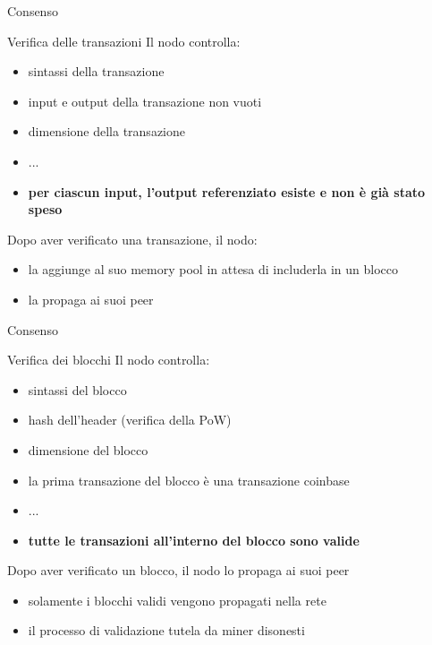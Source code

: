 \documentclass{beamer}
\begin{document}
  
  \begin{frame}{Consenso}
      \begin{block}{Verifica delle transazioni}
      Il nodo controlla: 
        \begin{itemize}
            \item sintassi della transazione
            \item input e output della transazione non vuoti
            \item dimensione della transazione 
            \item ...
            \item \textbf{per ciascun input, l'output referenziato esiste e non è già stato speso}
        \end{itemize}
      \end{block}
      Dopo aver verificato una transazione, il nodo:
      \begin{itemize}
          \item la aggiunge al suo memory pool in attesa di includerla in un blocco
          \item la propaga ai suoi peer
      \end{itemize}
  \end{frame}
  
  
  \begin{frame}{Consenso}
      \begin{block}{Verifica dei blocchi}
      Il nodo controlla:
        \begin{itemize}
            \item sintassi del blocco
            \item hash dell'header (verifica della PoW)
            \item dimensione del blocco 
            \item la prima transazione del blocco è una transazione coinbase
            \item ...
            \item \textbf{tutte le transazioni all'interno del blocco sono valide}
        \end{itemize}
      \end{block}
      Dopo aver verificato un blocco, il nodo lo propaga ai suoi peer
      \begin{itemize}
          \item [\MVRightarrow] solamente i blocchi validi vengono propagati nella rete
          \item [\MVRightarrow] il processo di validazione tutela da miner disonesti %
      \end{itemize}
  \end{frame}
  
\end{document}
